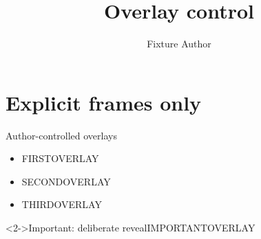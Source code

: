 \documentclass[11pt,aspectratio=169]{beamer}
\title{Overlay control}
\author{Fixture Author}
\begin{document}
\section{Explicit frames only}
\begin{frame}{Author-controlled overlays}
  \begin{itemize}
    \item<1-> FIRSTOVERLAY
    \item<2-> SECONDOVERLAY
    \item<3-> THIRDOVERLAY
  \end{itemize}
  \begin{importantblock}<2->{Important: deliberate reveal}IMPORTANTOVERLAY\end{importantblock}
\end{frame}
\end{document}
